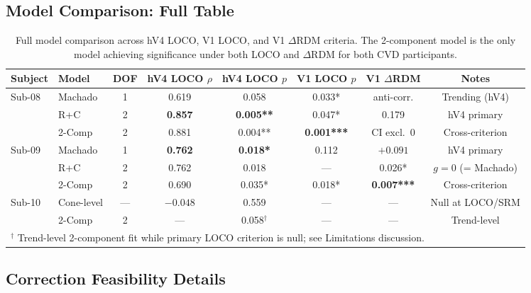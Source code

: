 \documentclass{article}
\begin{document}
\subsection{Model Comparison: Full Table}

\begin{table}[h]
  \caption{Full model comparison across hV4 LOCO, V1 LOCO, and V1 $\Delta$RDM criteria. The 2-component model is the only model achieving significance under both LOCO and $\Delta$RDM for both CVD participants.}
  \label{tab:full}
  \begin{center}
    \begin{small}
      \begin{tabular}{llcccccc}
        \toprule
        Subject & Model & DOF & hV4 LOCO $\rho$ & hV4 LOCO $p$ & V1 LOCO $p$ & V1 $\Delta$RDM & Notes \\
        \midrule
        \multirow{3}{*}{Sub-08} & Machado & 1 & 0.619 & 0.058 & 0.033* & anti-corr. & Trending (hV4) \\
        & R+C & 2 & \textbf{0.857} & \textbf{0.005**} & 0.047* & 0.179 & hV4 primary \\
        & 2-Comp & 2 & 0.881 & 0.004** & \textbf{0.001***} & CI excl.\ 0 & Cross-criterion \\
        \midrule
        \multirow{3}{*}{Sub-09} & Machado & 1 & \textbf{0.762} & \textbf{0.018*} & 0.112 & $+0.091$ & hV4 primary \\
        & R+C & 2 & 0.762 & 0.018 & --- & 0.026* & $g{=}0$ (= Machado) \\
        & 2-Comp & 2 & 0.690 & 0.035* & 0.018* & \textbf{0.007***} & Cross-criterion \\
        \midrule
        Sub-10 & Cone-level & --- & $-0.048$ & 0.559 & --- & --- & Null at LOCO/SRM \\
        & 2-Comp & 2 & --- & 0.058$^\dagger$ & --- & --- & Trend-level \\
        \bottomrule
        \multicolumn{8}{l}{\small $^\dagger$ Trend-level 2-component fit while primary LOCO criterion is null; see Limitations discussion.} \\
      \end{tabular}
    \end{small}
  \end{center}
\end{table}

\subsection{Correction Feasibility Details}
\end{document}
